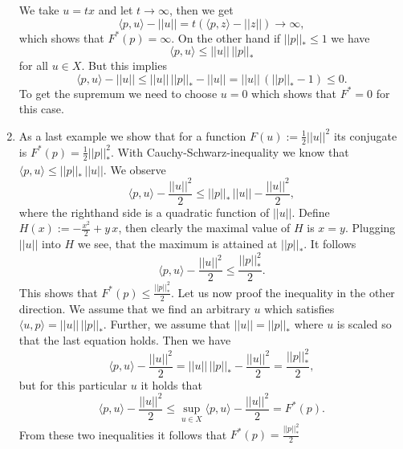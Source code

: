 \begin{example}
\begin{enumerate}
            We take $u = tx$ and let $t \longrightarrow \infty$, then we get
                $$
                    \langle p, u \rangle - ||u|| = t(\langle p, z \rangle - ||z||) \longrightarrow \infty,
                $$
            which shows that $F^{\ast}(p) = \infty$. On the other hand if $||p||_{\ast} \le 1$ we have
                $$
                    \langle p, u \rangle \le ||u|| \, ||p||_{\ast}
                $$
            for all $u \in X$. But this implies
                $$
                    \langle p, u \rangle - ||u|| \le ||u|| \, ||p||_{\ast} - ||u|| = ||u|| \, (||p||_{\ast} - 1) \le 0.
                $$
            To get the supremum we need to choose $u = 0$ which shows that $F^{\ast} = 0$ for this case.
            \item As a last example we show that for a function $F(u) := \frac{1}{2} ||u||^{2}$ its conjugate is $F^{\ast}(p) = \frac{1}{2} ||p||_{\ast}^{2}$. With Cauchy-Schwarz-inequality we know that $\langle p, u \rangle \le ||p||_{\ast}\,||u||$. We observe
                $$
                    \langle p, u \rangle - \frac{||u||^{2}}{2} \le ||p||_{\ast}\,||u|| - \frac{||u||^{2}}{2},
                $$
            where the righthand side is a quadratic function of $||u||$. Define $H(x) := -\frac{x^{2}}{2} + y\,x$, then clearly the maximal value of $H$ is $x = y$. Plugging $||u||$ into $H$ we see, that the maximum is attained at $||p||_{\ast}$. It follows
                $$
                    \langle p, u \rangle - \frac{||u||^{2}}{2} \le \frac{||p||_{\ast}^{2}}{2}.
                $$
            This shows that $F^{\ast}(p) \le \frac{||p||_{\ast}^{2}}{2}$. Let us now proof the inequality in the other direction. We assume that we find an arbitrary $u$ which satisfies $\langle u, p \rangle = ||u||\,||p||_{\ast}$. Further, we assume that $||u|| = ||p||_{\ast}$ where $u$ is scaled so that the last equation holds. Then we have
                $$
                    \langle p, u \rangle - \frac{||u||^{2}}{2} = ||u||\,||p||_{\ast} - \frac{||u||^{2}}{2} = \frac{||p||^{2}_{\ast}}{2},
                $$
            but for this particular $u$ it holds that
                $$
                    \langle p, u \rangle - \frac{||u||^{2}}{2} \le \sup\limits_{u \in X} \langle p, u \rangle - \frac{||u||^{2}}{2} = F^{\ast}(p).
                $$
            From these two inequalities it follows that $F^{\ast}(p) = \frac{||p||_{\ast}^{2}}{2}$
        \end{enumerate}
    \end{example}

